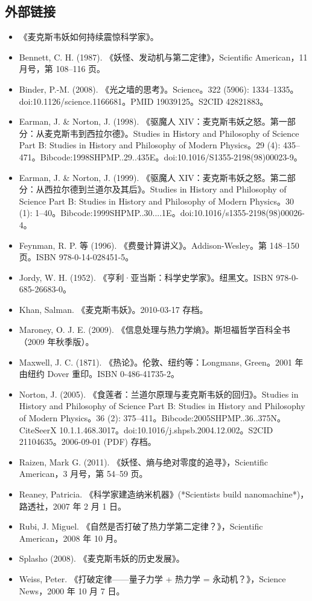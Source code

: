 \subsection{外部链接}
\begin{itemize}
\item 《麦克斯韦妖如何持续震惊科学家》。
\item Bennett, C. H. (1987). 《妖怪、发动机与第二定律》，Scientific American，11 月号，第 108–116 页。
\item Binder, P.-M. (2008). 《光之墙的思考》。Science。322 (5906): 1334–1335。doi:10.1126/science.1166681。PMID 19039125。S2CID 42821883。
\item Earman, J. & Norton, J. (1998). 《驱魔人 XIV：麦克斯韦妖之怒。第一部分：从麦克斯韦到西拉尔德》。Studies in History and Philosophy of Science Part B: Studies in History and Philosophy of Modern Physics。29 (4): 435–471。Bibcode:1998SHPMP..29..435E。doi:10.1016/S1355-2198(98)00023-9。
\item Earman, J. & Norton, J. (1999). 《驱魔人 XIV：麦克斯韦妖之怒。第二部分：从西拉尔德到兰道尔及其后》。Studies in History and Philosophy of Science Part B: Studies in History and Philosophy of Modern Physics。30 (1): 1–40。Bibcode:1999SHPMP..30....1E。doi:10.1016/s1355-2198(98)00026-4。
\item Feynman, R. P. 等 (1996). 《费曼计算讲义》。Addison-Wesley。第 148–150 页。ISBN 978-0-14-028451-5。
\item Jordy, W. H. (1952). 《亨利·亚当斯：科学史学家》。纽黑文。ISBN 978-0-685-26683-0。
\item Khan, Salman. 《麦克斯韦妖》。2010-03-17 存档。
\item Maroney, O. J. E. (2009). 《信息处理与热力学熵》。斯坦福哲学百科全书（2009 年秋季版）。
\item Maxwell, J. C. (1871). 《热论》。伦敦、纽约等：Longmans, Green。2001 年由纽约 Dover 重印。ISBN 0-486-41735-2。
\item Norton, J. (2005). 《食莲者：兰道尔原理与麦克斯韦妖的回归》。Studies in History and Philosophy of Science Part B: Studies in History and Philosophy of Modern Physics。36 (2): 375–411。Bibcode:2005SHPMP..36..375N。CiteSeerX 10.1.1.468.3017。doi:10.1016/j.shpsb.2004.12.002。S2CID 21104635。2006-09-01 (PDF) 存档。
\item Raizen, Mark G. (2011). 《妖怪、熵与绝对零度的追寻》，Scientific American，3 月号，第 54–59 页。
\item Reaney, Patricia. 《科学家建造纳米机器》(*Scientists build nanomachine*)，路透社，2007 年 2 月 1 日。
\item Rubi, J. Miguel. 《自然是否打破了热力学第二定律？》，Scientific American，2008 年 10 月。
\item Splasho (2008). 《麦克斯韦妖的历史发展》。
\item Weiss, Peter. 《打破定律——量子力学 + 热力学 = 永动机？》，Science News，2000 年 10 月 7 日。
\end{itemize}